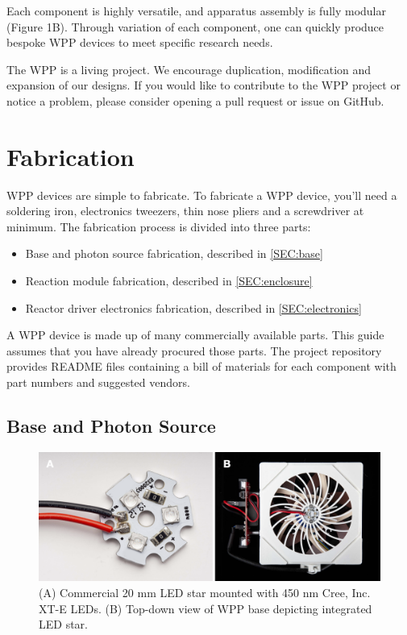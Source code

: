 \documentclass[11pt]{article}
\let\stdsection\section
\renewcommand\section{\clearpage\stdsection}
\begin{document}
Each component is highly versatile, and apparatus assembly is fully modular (Figure 1B).
Through variation of each component, one can quickly produce bespoke WPP devices to meet specific research needs.

The WPP is a living project.
We encourage duplication, modification and expansion of our designs.
If you would like to contribute to the WPP project or notice a problem, please consider opening a pull request or issue on GitHub.

\section{Fabrication}

WPP devices are simple to fabricate.
To fabricate a WPP device, you'll need a soldering iron, electronics tweezers, thin nose pliers and a screwdriver at minimum.
The fabrication process is divided into three parts:

\begin{itemize}
	\item Base and photon source fabrication, described in \autoref{SEC:base}
	\item Reaction module fabrication, described in \autoref{SEC:enclosure}
	\item Reactor driver electronics fabrication, described in \autoref{SEC:electronics}
\end{itemize}

A WPP device is made up of many commercially available parts.
This guide assumes that you have already procured those parts.
The project repository provides README files containing a bill of materials for each component with part numbers and suggested vendors.

\subsection{Base and Photon Source} \label{SEC:base}

\begin{figure}[H]
	\includegraphics[width=\textwidth]{"./fig2.png"}
	\caption{(A) Commercial 20 mm LED star mounted with 450 nm Cree, Inc. XT-E LEDs. (B) Top-down view of WPP base depicting integrated LED star.}
\end{figure}
\end{document}
